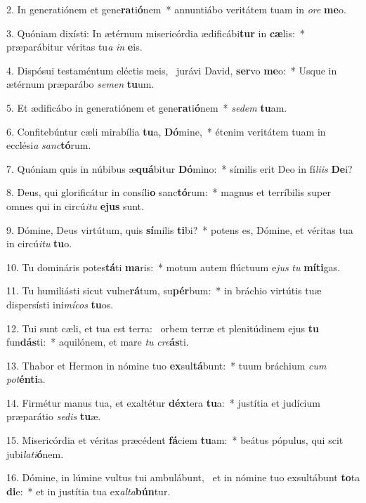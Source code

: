 2. In generatiónem et gene\textbf{ra}ti\textbf{ó}nem~*  annuntiábo veritátem tuam in \textit{o}\textit{re} \textbf{me}o.\

3. Quóniam dixísti: In ætérnum misericórdia ædificábi\textbf{tur} in \textbf{cæ}lis:~*  præparábitur véritas tu\textit{a} \textit{in} \textbf{e}is.\

4. Dispósui testaméntum eléctis meis, \dag\  jurávi David, \textbf{ser}vo \textbf{me}o:~*  Usque in ætérnum præparábo \textit{se}\textit{men} \textbf{tu}um.\

5. Et ædificábo in generatiónem et gene\textbf{ra}ti\textbf{ó}nem~*  \textit{se}\textit{dem} \textbf{tu}am.\

6. Confitebúntur cæli mirabília \textbf{tu}a, \textbf{Dó}mine,~*  étenim veritátem tuam in ecclési\textit{a} \textit{sanc}\textbf{tó}rum.\

7. Quóniam quis in núbibus æ\textbf{quá}bitur \textbf{Dó}mino:~*  símilis erit Deo in fí\textit{li}\textit{is} \textbf{De}i?\

8. Deus, qui glorificátur in consíli\textbf{o} sanc\textbf{tó}rum:~*  magnus et terríbilis super omnes qui in circú\textit{i}\textit{tu} \textbf{e}\textbf{jus} sunt.\

9. Dómine, Deus virtútum, quis \textbf{sí}milis \textbf{ti}bi?~*  potens es, Dómine, et véritas tua in circú\textit{i}\textit{tu} \textbf{tu}o.\

10. Tu domináris potes\textbf{tá}ti \textbf{ma}ris:~*  motum autem flúctuum e\textit{jus} \textit{tu} \textbf{mí}\textbf{ti}gas.\

11. Tu humiliásti sicut vulne\textbf{rá}tum, su\textbf{pér}bum:~*  in bráchio virtútis tuæ dispersísti ini\textit{mí}\textit{cos} \textbf{tu}os.\

12. Tui sunt cæli, et tua est terra: \dag\  orbem terræ et plenitúdinem ejus \textbf{tu} fun\textbf{dás}ti:~*  aquilónem, et mare \textit{tu} \textit{cre}\textbf{ás}ti.\

13. Thabor et Hermon in nómine tuo \textbf{ex}sul\textbf{tá}bunt:~*  tuum bráchium \textit{cum} \textit{pot}\textbf{én}\textbf{ti}a.\

14. Firmétur manus tua, et exaltétur \textbf{déx}tera \textbf{tu}a:~*  justítia et judícium præparátio \textit{se}\textit{dis} \textbf{tu}æ.\

15. Misericórdia et véritas præcédent \textbf{fá}ciem \textbf{tu}am:~*  beátus pópulus, qui scit jubi\textit{la}\textit{ti}\textbf{ó}nem.\

16. Dómine, in lúmine vultus tui ambulábunt, \dag\  et in nómine tuo exsultábunt \textbf{to}ta \textbf{di}e:~*  et in justítia tua ex\textit{al}\textit{ta}\textbf{bún}tur.\

